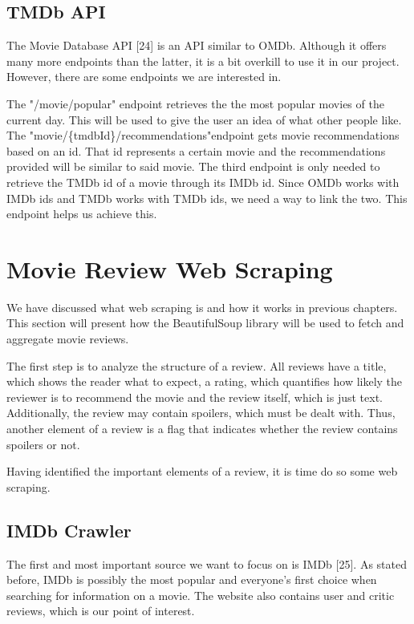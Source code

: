 \documentclass[12pt,a4paper,twoside]{report}
\begin{document}
\subsection{TMDb API}
The Movie Database API [24] is an API similar to OMDb. Although it offers many more endpoints than the latter, it is a bit overkill to use it in our project. However, there are some endpoints we are interested in.

The "/movie/popular" endpoint retrieves the the most popular movies of the current day. This will be used to give the user an idea of what other people like. The "movie/\{tmdbId\}/recommendations"endpoint gets movie recommendations based on an id. That id represents a certain movie and the recommendations provided will be similar to said movie. The third endpoint is only needed to retrieve the TMDb id of a movie through its IMDb id. Since OMDb works with IMDb ids and TMDb works with TMDb ids, we need a way to link the two. This endpoint helps us achieve this.


\section{Movie Review Web Scraping}
We have discussed what web scraping is and how it works in previous chapters. This section will present how the BeautifulSoup library will be used to fetch and aggregate movie reviews. 

The first step is to analyze the structure of a review. All reviews have a title, which shows the reader what to expect, a rating, which quantifies how likely the reviewer is to recommend the movie and the review itself, which is just text. Additionally, the review may contain spoilers, which must be dealt with. Thus, another element of a review is a flag that indicates whether the review contains spoilers or not. 

Having identified the important elements of a review, it is time do so some web scraping.

\subsection{IMDb Crawler}
The first and most important source we want to focus on is IMDb [25]. As stated before, IMDb is possibly the most popular and everyone's first choice when searching for information on a movie. The website also contains user and critic reviews, which is our point of interest.
\end{document}
